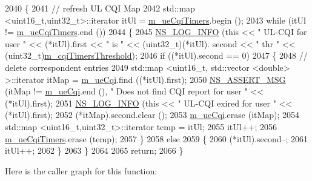 \begin{DoxyCode}
2040 \{
2041   \textcolor{comment}{// refresh UL CQI  Map}
2042   std::map <uint16\_t,uint32\_t>::iterator itUl = \hyperlink{classns3_1_1TtaFfMacScheduler_adb17b15e869d53e4244bf77f3f842f67}{m\_ueCqiTimers}.begin ();
2043   \textcolor{keywordflow}{while} (itUl != \hyperlink{classns3_1_1TtaFfMacScheduler_adb17b15e869d53e4244bf77f3f842f67}{m\_ueCqiTimers}.end ())
2044     \{
2045       \hyperlink{group__logging_gafbd73ee2cf9f26b319f49086d8e860fb}{NS\_LOG\_INFO} (\textcolor{keyword}{this} << \textcolor{stringliteral}{" UL-CQI for user "} << (*itUl).first << \textcolor{stringliteral}{" is "} << (uint32\_t)(*itUl).
      second << \textcolor{stringliteral}{" thr "} << (uint32\_t)\hyperlink{classns3_1_1TtaFfMacScheduler_a3dd8aa322782db3d0f2bbaf9fede6fca}{m\_cqiTimersThreshold});
2046       \textcolor{keywordflow}{if} ((*itUl).second == 0)
2047         \{
2048           \textcolor{comment}{// delete correspondent entries}
2049           std::map <uint16\_t, std::vector <double> >::iterator itMap = \hyperlink{classns3_1_1TtaFfMacScheduler_ac07e60af8c68f1cfac9b8666119af78f}{m\_ueCqi}.find ((*itUl).first);
2050           \hyperlink{assert_8h_aff5ece9066c74e681e74999856f08539}{NS\_ASSERT\_MSG} (itMap != \hyperlink{classns3_1_1TtaFfMacScheduler_ac07e60af8c68f1cfac9b8666119af78f}{m\_ueCqi}.end (), \textcolor{stringliteral}{" Does not find CQI report for user "}
       << (*itUl).first);
2051           \hyperlink{group__logging_gafbd73ee2cf9f26b319f49086d8e860fb}{NS\_LOG\_INFO} (\textcolor{keyword}{this} << \textcolor{stringliteral}{" UL-CQI exired for user "} << (*itUl).first);
2052           (*itMap).second.clear ();
2053           \hyperlink{classns3_1_1TtaFfMacScheduler_ac07e60af8c68f1cfac9b8666119af78f}{m\_ueCqi}.erase (itMap);
2054           std::map <uint16\_t,uint32\_t>::iterator temp = itUl;
2055           itUl++;
2056           \hyperlink{classns3_1_1TtaFfMacScheduler_adb17b15e869d53e4244bf77f3f842f67}{m\_ueCqiTimers}.erase (temp);
2057         \}
2058       \textcolor{keywordflow}{else}
2059         \{
2060           (*itUl).second--;
2061           itUl++;
2062         \}
2063     \}
2064 
2065   \textcolor{keywordflow}{return};
2066 \}
\end{DoxyCode}


Here is the caller graph for this function\+:


